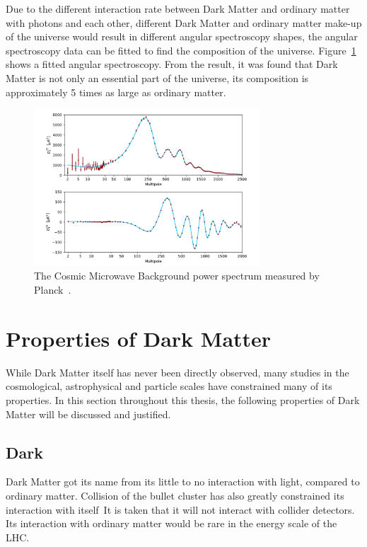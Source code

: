 Due to the different interaction rate between Dark Matter and ordinary matter with photons and each other, different Dark Matter and ordinary matter make-up of the universe would result in different angular spectroscopy shapes, the angular spectroscopy data can be fitted to find the composition of the universe. Figure~\ref{fig:CMBfigure} shows a fitted angular spectroscopy. From the result, it was found that Dark Matter is not only an essential part of the universe, its composition is approximately 5 times as large as ordinary matter. 

\begin{figure}[!htb]
    \begin{center}
        \includegraphics[width=0.75\textwidth]{figures/chapter_DM/CMB-angular-power-spectrum}
        \caption{
			The Cosmic Microwave Background power spectrum measured by Planck~\cite{CMB}.
        }
        \label{fig:CMBfigure}
    \end{center}
\end{figure}

\section{Properties of Dark Matter}
\label{section:properties}
While Dark Matter itself has never been directly observed, many studies in the cosmological, astrophysical and particle scales have constrained many of its properties. In this section throughout this thesis, the following properties of Dark Matter will be discussed and justified.

\subsection{Dark}
Dark Matter got its name from its little to no interaction with light, compared to ordinary matter. Collision of the bullet cluster has also greatly constrained its interaction with itself\  
It is taken that it will not interact with collider detectors. Its interaction with ordinary matter would be rare in the energy scale of the LHC. 

